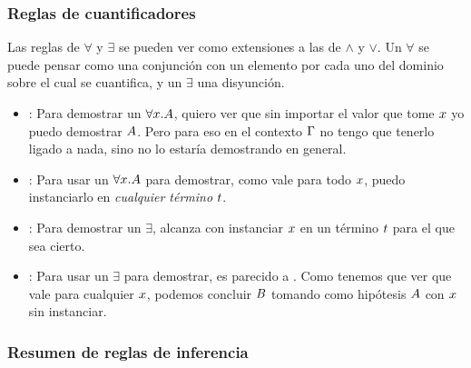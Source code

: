 \subsubsection{Reglas de cuantificadores}


Las reglas de $\forall$ y $\exists$ se pueden ver como extensiones a las de
$\wedge$ y $\vee$. Un $\forall$ se puede pensar como una conjunción con un
elemento por cada uno del dominio sobre el cual se cuantifica, y un $\exists$
una disyunción.

\begin{multicols}{2}
    \proofTreeForallI
    \proofTreeForallE
\end{multicols}

\begin{itemize}
    \item {}: Para demostrar un $\forall x. A$, quiero ver que sin importar el valor que tome $x$ yo puedo demostrar $A$. Pero para eso en el contexto $\Gamma$ no tengo que tenerlo ligado a nada, sino no lo estaría demostrando en general.
    \item {}: Para usar un $\forall x.A$ para demostrar, como
    vale para todo $x$, puedo instanciarlo en \textit{cualquier término} $t$.
\end{itemize}

\proofTreeExistsI
\proofTreeExistsE

\begin{itemize}
    \item {}: Para demostrar un $\exists$, alcanza con instanciar $x$ en un término $t$ para el que sea cierto.
    \item {}: Para usar un $\exists$ para demostrar, es parecido a . Como tenemos que ver que vale para cualquier $x$, podemos concluir $B$ tomando como hipótesis $A$ con $x$ sin instanciar. 
\end{itemize}


\subsubsection{Resumen de reglas de inferencia}

